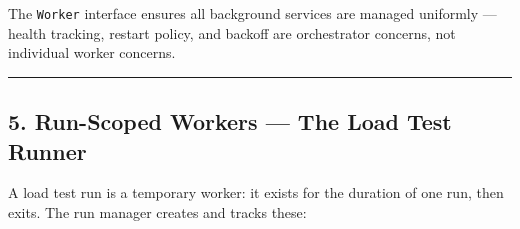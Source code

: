 \documentclass[
]{article}
\begin{document}
The \texttt{Worker} interface ensures all background services are
managed uniformly --- health tracking, restart policy, and backoff are
orchestrator concerns, not individual worker concerns.

\begin{center}\rule{0.5\linewidth}{0.5pt}\end{center}

\hypertarget{run-scoped-workers-the-load-test-runner}{%
\subsection{5. Run-Scoped Workers --- The Load Test
Runner}\label{run-scoped-workers-the-load-test-runner}}

A load test run is a temporary worker: it exists for the duration of one
run, then exits. The run manager creates and tracks these:
\end{document}

